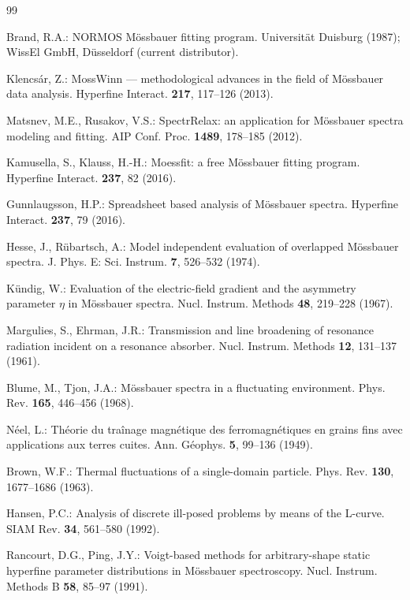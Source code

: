 \documentclass[smallcondensed]{svjour3}
\begin{document}
\begin{thebibliography}{99}

  Brand, R.A.: NORMOS Mössbauer fitting program.
  Universität Duisburg (1987); WissEl GmbH, Düsseldorf (current distributor).

  Klencsár, Z.: MossWinn — methodological advances in the field of
  Mössbauer data analysis.
  Hyperfine Interact. \textbf{217}, 117--126 (2013).

  Matsnev, M.E., Rusakov, V.S.: SpectrRelax: an application for Mössbauer
  spectra modeling and fitting.
  AIP Conf. Proc. \textbf{1489}, 178--185 (2012).

  Kamusella, S., Klauss, H.-H.: Moessfit: a free Mössbauer fitting program.
  Hyperfine Interact. \textbf{237}, 82 (2016).

  Gunnlaugsson, H.P.: Spreadsheet based analysis of Mössbauer spectra.
  Hyperfine Interact. \textbf{237}, 79 (2016).

  Hesse, J., Rübartsch, A.: Model independent evaluation of overlapped
  Mössbauer spectra.
  J. Phys. E: Sci. Instrum. \textbf{7}, 526--532 (1974).

  Kündig, W.: Evaluation of the electric-field gradient and the asymmetry
  parameter $\eta$ in Mössbauer spectra.
  Nucl. Instrum. Methods \textbf{48}, 219--228 (1967).

  Margulies, S., Ehrman, J.R.: Transmission and line broadening of resonance
  radiation incident on a resonance absorber.
  Nucl. Instrum. Methods \textbf{12}, 131--137 (1961).

  Blume, M., Tjon, J.A.: Mössbauer spectra in a fluctuating environment.
  Phys. Rev. \textbf{165}, 446--456 (1968).

  Néel, L.: Théorie du traînage magnétique des ferromagnétiques en grains
  fins avec applications aux terres cuites.
  Ann. Géophys. \textbf{5}, 99--136 (1949).

  Brown, W.F.: Thermal fluctuations of a single-domain particle.
  Phys. Rev. \textbf{130}, 1677--1686 (1963).

  Hansen, P.C.: Analysis of discrete ill-posed problems by means of the
  L-curve.
  SIAM Rev. \textbf{34}, 561--580 (1992).

  Rancourt, D.G., Ping, J.Y.: Voigt-based methods for arbitrary-shape static
  hyperfine parameter distributions in Mössbauer spectroscopy.
  Nucl. Instrum. Methods B \textbf{58}, 85--97 (1991).

\end{thebibliography}
\end{document}
